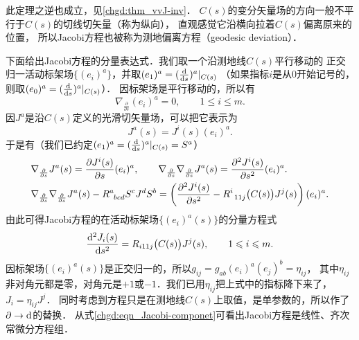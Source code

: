 此定理之逆也成立，见\ref{chgd:thm_vvJ-inv}．
$C(s)$的变分矢量场的方向一般不平行于$C(s)$的切线切矢量（称为纵向），
直观感觉它沿横向拉着$C(s)$偏离原来的位置，
所以Jacobi方程也被称为{\heiti 测地偏离方程}（geodesic deviation）．



下面给出Jacobi方程的分量表达式．我们取一个沿测地线$C(s)$平行移动的
正交归一活动标架场$\{(e_i)^a\}$，并取$(e_1)^a=(\frac{{\rm d}}{{\rm d}s})^a|_{C(s)}$
（如果指标$i$是从$0$开始记号的，则取$(e_0)^a=(\frac{{\rm d}}{{\rm d}s})^a|_{C(s)}$）．
因标架场是平行移动的，所以有
\begin{equation}
    \nabla_{\frac{\partial}{\partial s}} (e_i)^a=0,\qquad 1\leqslant i \leqslant m.
\end{equation}
因$J^a$是沿$C(s)$定义的光滑切矢量场，可以把它表示为
\begin{equation}
    J^a(s) =  J^i(s) (e_i)^a .
\end{equation}
于是有（我们已约定$(e_1)^a=(\frac{{\rm d}}{{\rm d}s})^a|_{C(s)}=S^a$）
\begin{align}
    &\nabla_{\frac{\partial}{\partial s}} J^a(s) = \frac{\partial J^i(s)}{\partial s} (e_i)^a, \qquad
    \nabla_{\frac{\partial}{\partial s}} \nabla_{\frac{\partial}{\partial s}} J^a(s) =
      \frac{\partial^2 J^i(s)}{\partial s^2} (e_i)^a. \\
    &\nabla_{\frac{\partial}{\partial s}} \nabla_{\frac{\partial}{\partial s}} J^a(s)
     -R^{a}_{\hphantom{a} bcd} {S}^c{J}^d {S}^b = \left( \frac{\partial^2 J^i(s)}{\partial s^2}
     -R^i_{\hphantom{a} 11j}\bigl(C(s)\bigr) J^j(s) \right)(e_i)^a .
\end{align}
由此可得Jacobi方程的在活动标架场$\{(e_i)^a(s)\}$的分量方程式
\begin{equation}\label{chgd:eqn_Jacobi-componet}
    \frac{{\rm d}^2 J_i(s)}{{\rm d} s^2} =R_{i11j}\bigl(C(s)\bigr) J^j(s) ,
    \qquad  1\leqslant i \leqslant m.
\end{equation}
因标架场$\{(e_i)^a(s)\}$是正交归一的，所以$g_{ij}=g_{ab}(e_i)^a(e_j)^b=\eta_{ij}$，
其中$\eta_{ij}$非对角元都是零，对角元是$+1$或$-1$．我们已用$\eta_{ij}$把上式中的指标降下来了，
$J_i=\eta_{ij} J^j$．
同时考虑到方程只是在测地线$C(s)$上取值，是单参数的，所以作了$\partial \to {\rm d}$的替换．
从式\eqref{chgd:eqn_Jacobi-componet}可看出Jacobi方程是线性、齐次常微分方程组．

